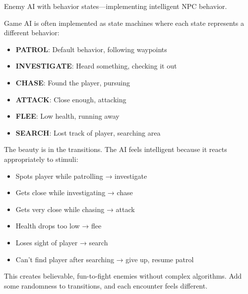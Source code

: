 Enemy AI with behavior states—implementing intelligent NPC behavior.

Game AI is often implemented as state machines where each state represents a different behavior:

\begin{itemize}
    \item \textbf{PATROL}: Default behavior, following waypoints
    \item \textbf{INVESTIGATE}: Heard something, checking it out
    \item \textbf{CHASE}: Found the player, pursuing
    \item \textbf{ATTACK}: Close enough, attacking
    \item \textbf{FLEE}: Low health, running away
    \item \textbf{SEARCH}: Lost track of player, searching area
\end{itemize}

The beauty is in the transitions. The AI feels intelligent because it reacts appropriately to stimuli:
\begin{itemize}
    \item Spots player while patrolling → investigate
    \item Gets close while investigating → chase
    \item Gets very close while chasing → attack
    \item Health drops too low → flee
    \item Loses sight of player → search
    \item Can't find player after searching → give up, resume patrol
\end{itemize}

This creates believable, fun-to-fight enemies without complex algorithms. Add some randomness to transitions, and each encounter feels different.

